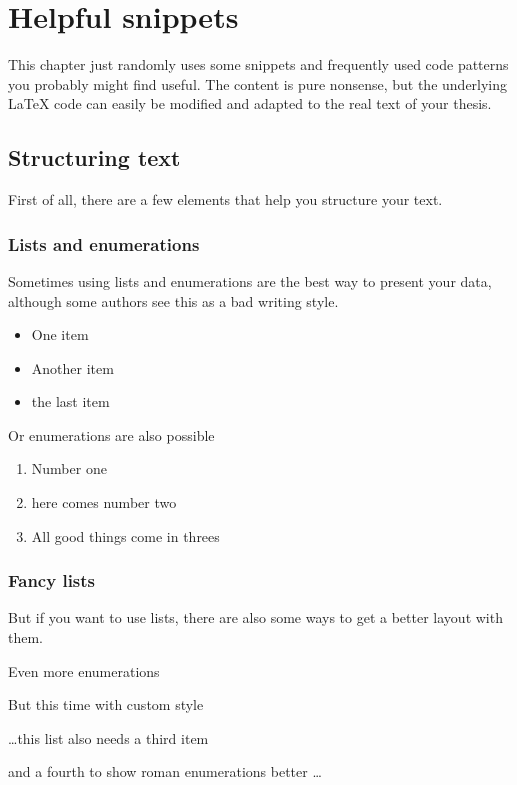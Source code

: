 \documentclass[\myrootdir/main.tex]{subfiles}
\begin{document}
\chapter{Helpful snippets}

This chapter just randomly uses some snippets and frequently used code patterns you probably might find useful.
The content is pure nonsense, but the underlying LaTeX code can easily be modified and adapted to the real text of your thesis.

\section{Structuring text}

First of all, there are a few elements that help you structure your text.

\subsection{Lists and enumerations}

Sometimes using lists and enumerations are the best way to present your data, although some authors see this as a bad writing style.

\begin{itemize}
 \item One item
 \item Another item
 \item the last item
\end{itemize}

\noindent Or enumerations are also possible

\begin{enumerate}
 \item Number one
 \item here comes number two
 \item All good things come in threes
\end{enumerate}

\subsection{Fancy lists}

But if you want to use lists, there are also some ways to get a better layout with them.

\begin{enumerate}[label=\textbf{[\Roman*]}]
 \item Even more enumerations
 \item But this time with custom style
 \item \ldots this list also needs a third item
 \item and a fourth to show roman enumerations better \ldots
\end{enumerate}
\end{document}
